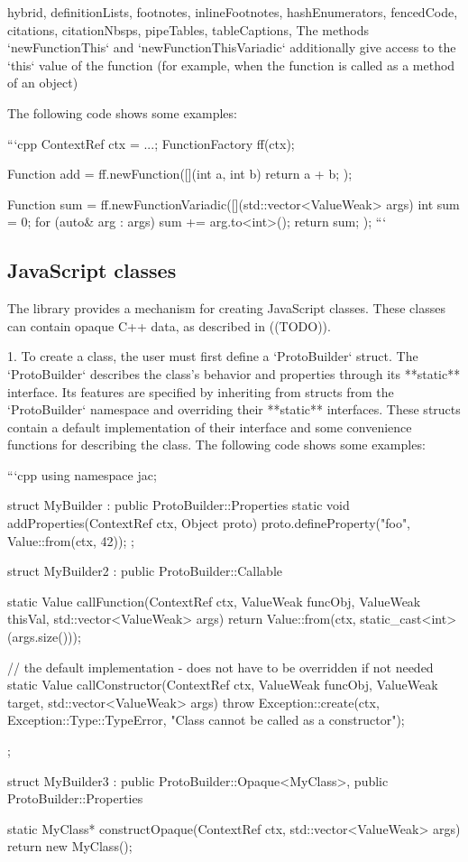 \begin{markdown*}{%
  hybrid,
  definitionLists,
  footnotes,
  inlineFootnotes,
  hashEnumerators,
  fencedCode,
  citations,
  citationNbsps,
  pipeTables,
  tableCaptions,
}
The methods `newFunctionThis` and `newFunctionThisVariadic` additionally give access to the `this` value of the function (for example,
when the function is called as a method of an object)

The following code shows some examples:

```cpp
ContextRef ctx = ...;
FunctionFactory ff(ctx);

Function add = ff.newFunction([](int a, int b) { return a + b; });

Function sum = ff.newFunctionVariadic([](std::vector<ValueWeak> args) {
    int sum = 0;
    for (auto& arg : args) {
        sum += arg.to<int>();
    }
    return sum;
});
```

\subsection{JavaScript classes}

The library provides a mechanism for creating JavaScript classes. These classes can contain opaque C++ data, as described in ((TODO)).

  1. To create a class, the user must first define a `ProtoBuilder` struct. The `ProtoBuilder` describes the class's behavior and properties through its **static** interface. Its features are specified by inheriting from structs from the `ProtoBuilder` namespace and overriding their **static** interfaces. These structs contain a default implementation of their interface and some convenience functions for describing the class. The following code shows some examples:

```cpp
using namespace jac;

struct MyBuilder : public ProtoBuilder::Properties {
    static void addProperties(ContextRef ctx, Object proto) {
        proto.defineProperty("foo", Value::from(ctx, 42));
    }
};

struct MyBuilder2 : public ProtoBuilder::Callable {
    static Value callFunction(ContextRef ctx, ValueWeak funcObj, ValueWeak thisVal, std::vector<ValueWeak> args) {
        return Value::from(ctx, static_cast<int>(args.size()));
    }

    // the default implementation - does not have to be overridden if not needed
    static Value callConstructor(ContextRef ctx, ValueWeak funcObj, ValueWeak target, std::vector<ValueWeak> args) {
        throw Exception::create(ctx, Exception::Type::TypeError, "Class cannot be called as a constructor");
    }
};

struct MyBuilder3 : public ProtoBuilder::Opaque<MyClass>, public ProtoBuilder::Properties {
    static MyClass* constructOpaque(ContextRef ctx, std::vector<ValueWeak> args) {
        return new MyClass();
    }

}
\end{markdown*}

